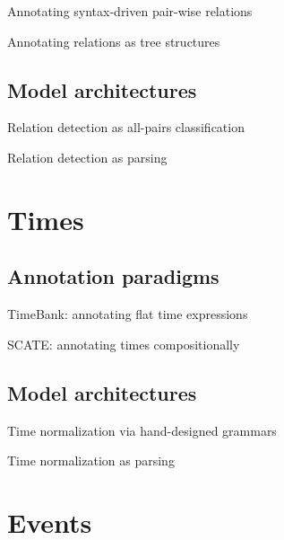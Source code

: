 \documentclass[12pt,compress]{beamer}
\begin{document}
\begin{frame}{Annotating syntax-driven pair-wise relations}
\end{frame}


\begin{frame}{Annotating relations as tree structures}
\end{frame}


\subsection{Model architectures}


\begin{frame}{Relation detection as all-pairs classification}
\end{frame}


\begin{frame}{Relation detection as parsing}
\end{frame}


\section{Times}


\subsection{Annotation paradigms}


\begin{frame}{TimeBank: annotating flat time expressions}
\end{frame}


\begin{frame}{SCATE: annotating times compositionally}
\end{frame}


\subsection{Model architectures}


\begin{frame}{Time normalization via hand-designed grammars}
\end{frame}


\begin{frame}{Time normalization as parsing}
\end{frame}


\section{Events}
\end{document}
